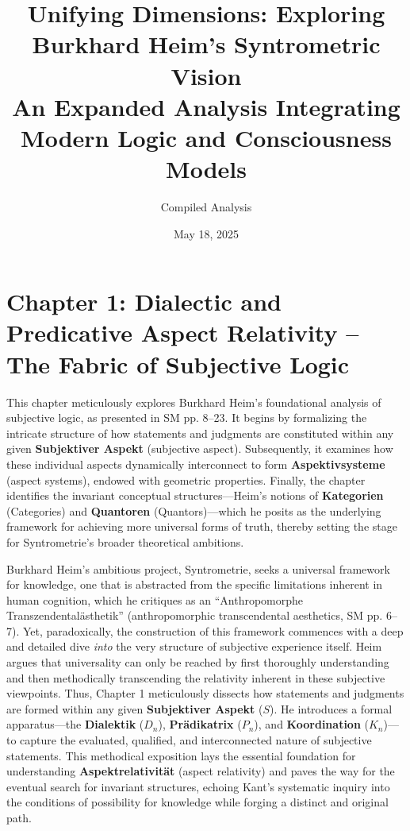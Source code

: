 \documentclass[12pt]{article}
\newcommand{\q}[1]{\enquote{#1}}
\newcommand{\subjektiveraspekt}{S}
\newcommand{\pradikatrix}{P}
\newcommand{\dialektik}{D}
\newcommand{\koordination}{K}
\begin{document}
\title{Unifying Dimensions: Exploring Burkhard Heim's Syntrometric Vision \\ \large An Expanded Analysis Integrating Modern Logic and Consciousness Models}
\author{Compiled Analysis}
\date{May 18, 2025}
\maketitle

\tableofcontents
\clearpage


\section{Chapter 1: Dialectic and Predicative Aspect Relativity – The Fabric of Subjective Logic}
\label{sec:chapter1}

This chapter meticulously explores Burkhard Heim's foundational analysis of subjective logic, as presented in SM pp. 8--23. It begins by formalizing the intricate structure of how statements and judgments are constituted within any given \textbf{Subjektiver Aspekt} (subjective aspect). Subsequently, it examines how these individual aspects dynamically interconnect to form \textbf{Aspektivsysteme} (aspect systems), endowed with geometric properties. Finally, the chapter identifies the invariant conceptual structures—Heim's notions of \textbf{Kategorien} (Categories) and \textbf{Quantoren} (Quantors)—which he posits as the underlying framework for achieving more universal forms of truth, thereby setting the stage for Syntrometrie's broader theoretical ambitions.

Burkhard Heim's ambitious project, Syntrometrie, seeks a universal framework for knowledge, one that is abstracted from the specific limitations inherent in human cognition, which he critiques as an \q{Anthropomorphe Transzendental\"{a}sthetik} (anthropomorphic transcendental aesthetics, SM pp. 6--7). Yet, paradoxically, the construction of this framework commences with a deep and detailed dive \textit{into} the very structure of subjective experience itself. Heim argues that universality can only be reached by first thoroughly understanding and then methodically transcending the relativity inherent in these subjective viewpoints. Thus, Chapter 1 meticulously dissects how statements and judgments are formed within any given \textbf{Subjektiver Aspekt} (\(\subjektiveraspekt\)). He introduces a formal apparatus—the \textbf{Dialektik} (\(\dialektik_n\)), \textbf{Pr\"{a}dikatrix} (\(\pradikatrix_n\)), and \textbf{Koordination} (\(\koordination_n\))—to capture the evaluated, qualified, and interconnected nature of subjective statements. This methodical exposition lays the essential foundation for understanding \textbf{Aspektrelativit\"{a}t} (aspect relativity) and paves the way for the eventual search for invariant structures, echoing Kant’s systematic inquiry into the conditions of possibility for knowledge while forging a distinct and original path.
\end{document}
